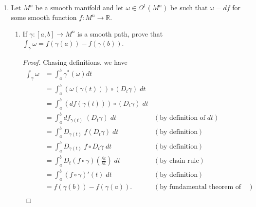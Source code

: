 \documentclass{article}
\begin{document}
\begin{enumerate}[label={\bf Q\arabic*:}]
  \item Let $M^n$ be a smooth manifold and let $\omega\in\Omega^1(M^n)$ be
    such that $\omega=df$ for some smooth function
    $f:M^n\rightarrow\mathbb{R}$.

    \begin{enumerate}
      \item If $\gamma:[a,b]\rightarrow M^n$ is a smooth path, prove that
        $\int_\gamma\omega=f(\gamma(a))-f(\gamma(b))$.
        \begin{proof}
          Chasing definitions, we have
          \begin{align*}
            \int_\gamma\omega &=\int_a^b\gamma^*(\omega)dt \\
              &=\int_a^b(\omega(\gamma(t))) \circ(D_t\gamma)\; dt \\
              &=\int_a^b(df(\gamma(t))) \circ(D_t\gamma)\; dt \\
              &=\int_a^b df_{\gamma(t)}\; (D_t\gamma)\; dt &(\text{by
                definition of}\; dt) \\
              &=\int_a^b D_{\gamma(t)}\; f(D_t\gamma)\; dt &(\text{by
                definition}) \\
              &=\int_a^b D_{\gamma(t)}\; f\circ D_t\gamma\; dt &(\text{by
                definition}) \\
              &=\int_a^b D_{t}(f\circ\gamma)(\frac{\partial t}{\partial
                t})\; dt &(\text{by chain rule}) \\
              &=\int_a^b (f\circ\gamma)'(t)\; dt &(\text{by definition}) \\
              &=f(\gamma(b))-f(\gamma(a)). &(\text{by fundamental theorem of
                calculus}) \\
          \end{align*}
        \end{proof}
    \end{enumerate}
\end{enumerate}
\end{document}
